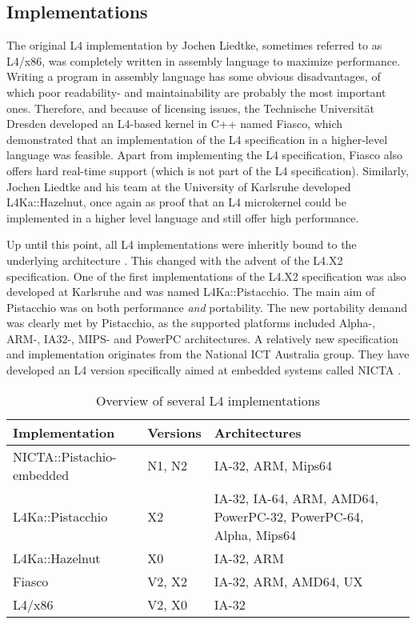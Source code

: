 \subsection{Implementations}
The original L4 implementation by Jochen Liedtke, sometimes referred to as L4/x86, was completely written in assembly language to maximize performance. Writing a program in assembly language has some obvious disadvantages, of which poor readability- and maintainability are probably the most important ones. Therefore, and because of licensing issues, the Technische Universit{\"a}t Dresden developed an L4-based kernel in C++ named Fiasco, which demonstrated that an implementation of the L4 specification in a higher-level language was feasible. Apart from implementing the L4 specification, Fiasco also offers hard real-time support (which is not part of the L4 specification). Similarly, Jochen Liedtke and his team at the University of Karlsruhe developed L4Ka::Hazelnut, once again as proof that an L4 microkernel could be implemented in a higher level language and still offer high performance.\emptyline

Up until this point, all L4 implementations were inheritly bound to the underlying architecture \cite{liedtke95kernel}. This changed with the advent of the L4.X2 specification. One of the first implementations of the L4.X2 specification was also developed at Karlsruhe and was named L4Ka::Pistacchio. The main aim of Pistacchio was on both performance \textit{and} portability. The new portability demand was clearly met by Pistacchio, as the supported platforms included Alpha-, ARM-, IA32-, MIPS- and PowerPC architectures. A relatively new specification and implementation originates from the National ICT Australia group. They have developed an L4 version specifically aimed at embedded systems called NICTA \cite{nicta05embedded}. 

\begin{table}[ht]
\begin{tabular}{l|l|p{20em}}
Implementation & Versions & Architectures \\
\hline
NICTA::Pistachio-embedded & N1, N2 & IA-32, ARM, Mips64 \\
L4Ka::Pistacchio & X2 & IA-32, IA-64, ARM, AMD64, PowerPC-32, PowerPC-64, Alpha, Mips64 \\
L4Ka::Hazelnut & X0 & IA-32, ARM \\
Fiasco & V2, X2 & IA-32, ARM, AMD64, UX \\
L4/x86 & V2, X0 & IA-32 \\
\end{tabular}
\caption{Overview of several L4 implementations}
\end{table}

